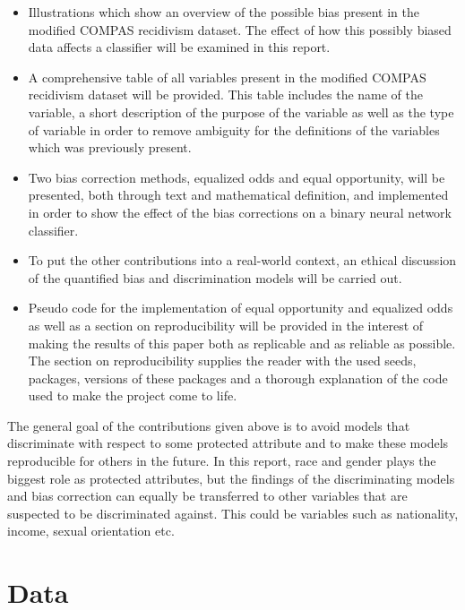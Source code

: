 \documentclass[11pt, fleqn, titlepage]{article}
\begin{document}
	\begin{itemize}
		\item Illustrations which show an overview of the possible bias present in the modified COMPAS recidivism dataset. The effect of how this possibly biased data affects a classifier will be examined in this report. 
		\item A comprehensive table of all variables present in the modified COMPAS recidivism dataset will be provided. This table includes the name of the variable, a short description of the purpose of the variable as well as the type of variable in order to remove ambiguity for the definitions of the variables which was previously present.
		\item Two bias correction methods, equalized odds and equal opportunity, will be presented, both through text and mathematical definition, and implemented in order to show the effect of the bias corrections on a binary neural network classifier.
		\item To put the other contributions into a real-world context, an ethical discussion of the quantified bias and discrimination models will be carried out.
		\item Pseudo code for the implementation of equal opportunity and equalized odds as well as a section on reproducibility will be provided in the interest of making the results of this paper both as replicable and as reliable as possible. The section on reproducibility supplies the reader with the used seeds, packages, versions of these packages and a thorough explanation of the code used to make the project come to life.
	\end{itemize}
	The general goal of the contributions given above is to avoid models that discriminate with respect to some protected attribute and to make these models reproducible for others in the future. In this report, race and gender plays the biggest role as protected attributes, but the findings of the discriminating models and bias correction can equally be transferred to other variables that are suspected to be discriminated against. This could be variables such as nationality, income, sexual orientation etc.
	
	\section{Data} \label{data}
	
\end{document}
